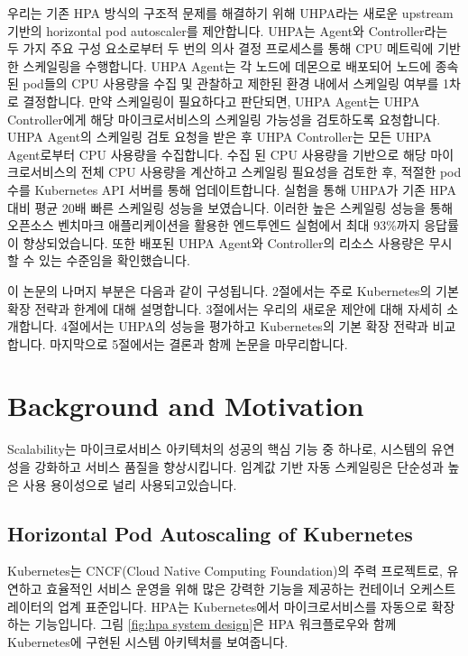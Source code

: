 \documentclass[conference]{IEEEtran}
\begin{document}
우리는 기존 HPA 방식의 구조적 문제를 해결하기 위해 UHPA라는 새로운 upstream 기반의 horizontal pod autoscaler를 제안합니다. UHPA는 Agent와 Controller라는 두 가지 주요 구성 요소로부터 두 번의 의사 결정 프로세스를 통해 CPU 메트릭에 기반한 스케일링을 수행합니다. UHPA Agent는 각 노드에 데몬으로 배포되어 노드에 종속된 pod들의 CPU 사용량을 수집 및 관찰하고 제한된 환경 내에서 스케일링 여부를 1차로 결정합니다. 만약 스케일링이 필요하다고 판단되면, UHPA Agent는 UHPA Controller에게 해당 마이크로서비스의 스케일링 가능성을 검토하도록 요청합니다. UHPA Agent의 스케일링 검토 요청을 받은 후 UHPA Controller는 모든 UHPA Agent로부터 CPU 사용량을 수집합니다. 수집 된 CPU 사용량을 기반으로 해당 마이크로서비스의 전체 CPU 사용량을 계산하고 스케일링 필요성을 검토한 후, 적절한 pod 수를 Kubernetes API 서버를 통해 업데이트합니다. 실험을 통해 UHPA가 기존 HPA 대비 평균 20배 빠른 스케일링 성능을 보였습니다. 이러한 높은 스케일링 성능을 통해 오픈소스 벤치마크 애플리케이션을 활용한 엔드투엔드 실험에서 최대 93\%까지 응답률이 향상되었습니다. 또한 배포된 UHPA Agent와 Controller의 리소스 사용량은 무시할 수 있는 수준임을 확인했습니다.

이 논문의 나머지 부분은 다음과 같이 구성됩니다. 2절에서는 주로 Kubernetes의 기본 확장 전략과 한계에 대해 설명합니다. 3절에서는 우리의 새로운 제안에 대해 자세히 소개합니다. 4절에서는 UHPA의 성능을 평가하고 Kubernetes의 기본 확장 전략과 비교합니다. 마지막으로 5절에서는 결론과 함께 논문을 마무리합니다.


\section{Background and Motivation}
\label{sec:background and motivation}
Scalability는 마이크로서비스 아키텍처의 성공의 핵심 기능 중 하나로, 시스템의 유연성을 강화하고 서비스 품질을 향상시킵니다. 임계값 기반 자동 스케일링은 단순성과 높은 사용 용이성으로 널리 사용되고있습니다.

\subsection{Horizontal Pod Autoscaling of Kubernetes}
Kubernetes는 CNCF(Cloud Native Computing Foundation)의 주력 프로젝트로, 유연하고 효율적인 서비스 운영을 위해 많은 강력한 기능을 제공하는 컨테이너 오케스트레이터의 업계 표준입니다. HPA는 Kubernetes에서 마이크로서비스를 자동으로 확장하는 기능입니다. 그림 \ref{fig:hpa system design}은 HPA 워크플로우와 함께 Kubernetes에 구현된 시스템 아키텍처를 보여줍니다.
\end{document}
